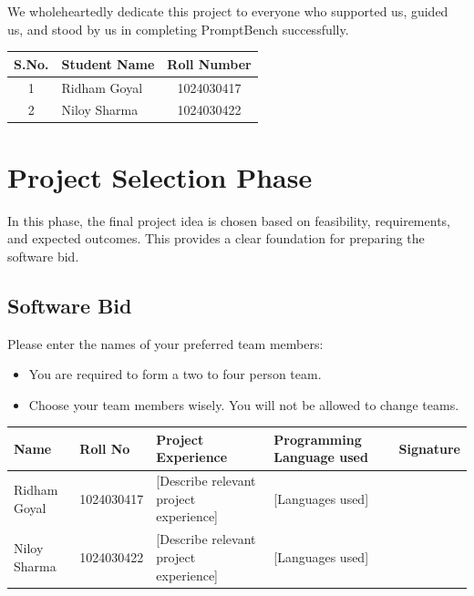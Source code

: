 \documentclass[11pt]{article}
\begin{document}
We wholeheartedly dedicate this project to everyone who supported us, guided us, and stood
by us in completing PromptBench successfully.

\vspace{0.5cm}
\begin{table}[h]
\centering
\begin{tabular}{|c|l|c|}
\hline
\textbf{S.No.} & \textbf{Student Name} & \textbf{Roll Number} \\
\hline
1 & Ridham Goyal & 1024030417 \\
\hline
2 & Niloy Sharma & 1024030422 \\
\hline
\end{tabular}
\end{table}

\newpage
\tableofcontents
\newpage

\section{Project Selection Phase}
In this phase, the final project idea is chosen based on feasibility, requirements, and expected
outcomes. This provides a clear foundation for preparing the software bid.

\subsection{Software Bid}

Please enter the names of your preferred team members:
\begin{itemize}[nosep]
  \item You are required to form a two to four person team.
  \item Choose your team members wisely. You will not be allowed to change teams.
\end{itemize}

\begin{longtable}{|p{2.6cm}|p{1.8cm}|p{4.3cm}|p{3cm}|p{1.5cm}|}
\hline
\textbf{Name} & \textbf{Roll No} & \textbf{Project Experience} & \textbf{Programming Language used} & \textbf{Signature} \\
\hline
Ridham Goyal & 1024030417 & [Describe relevant project experience] & [Languages used] & \\
\hline
Niloy Sharma & 1024030422 & [Describe relevant project experience] & [Languages used] & \\
\hline
\end{longtable}
\end{document}
